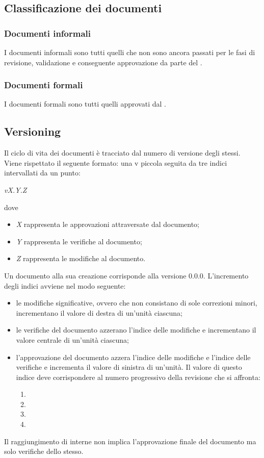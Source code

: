 \subsection{Classificazione dei documenti}
\subsubsection{Documenti informali}
I documenti informali sono tutti quelli che non sono ancora passati per le fasi di revisione, validazione e conseguente approvazione da parte del \Responsabile.

\subsubsection{Documenti formali}
I documenti formali sono tutti quelli approvati dal \Responsabile.

\subsection{Versioning}
Il ciclo di vita dei documenti è tracciato dal numero di versione degli stessi.\\
Viene rispettato il seguente formato: una v piccola seguita da tre indici intervallati da un punto:
\begin{center}
	\textit{vX.Y.Z}
\end{center}
dove
\begin{itemize}
	\item \textit{X} rappresenta le approvazioni attraversate dal documento;
	\item \textit{Y} rappresenta le verifiche al documento;
	\item \textit{Z} rappresenta le modifiche al documento.
\end{itemize}
Un documento alla sua creazione corrisponde alla versione 0.0.0. L’incremento degli indici avviene nel modo seguente:
\begin{itemize}
	\item le modifiche significative, ovvero che non consistano di sole correzioni minori, incrementano il valore di destra di un'unità ciascuna;
	\item le verifiche del documento azzerano l'indice delle modifiche e incrementano il valore centrale di un'unità ciascuna;
	\item l'approvazione del documento azzera l'indice delle modifiche e l'indice delle verifiche e incrementa il valore di sinistra di un'unità. Il valore di questo indice deve corrispondere al numero progressivo della revisione che si affronta:
	\begin{enumerate}
		\item \RR
		\item \RP
		\item \RQ
		\item \RA
	\end{enumerate} 
\end{itemize}
Il raggiungimento di  interne non implica l'approvazione finale del documento ma solo verifiche dello stesso.

